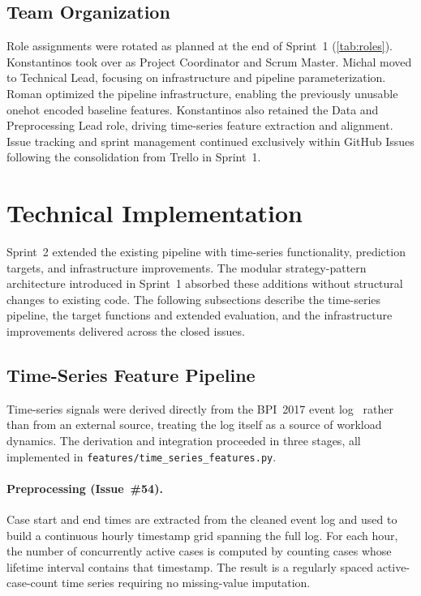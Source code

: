 \documentclass[runningheads]{llncs}
\begin{document}
\subsection{Team Organization}

Role assignments were rotated as planned at the end of Sprint~1 (\autoref{tab:roles}). Konstantinos took over as Project Coordinator and Scrum Master. Michal moved to Technical Lead, focusing on infrastructure and pipeline parameterization. Roman optimized the pipeline infrastructure, enabling the previously unusable onehot encoded baseline features. Konstantinos also retained the Data and Preprocessing Lead role, driving time-series feature extraction and alignment. Issue tracking and sprint management continued exclusively within GitHub Issues following the consolidation from Trello in Sprint~1.


\section{Technical Implementation}

Sprint~2 extended the existing pipeline with time-series functionality, prediction targets, and infrastructure improvements. The modular strategy-pattern architecture introduced in Sprint~1 absorbed these additions without structural changes to existing code. The following subsections describe the time-series pipeline, the target functions and extended evaluation, and the infrastructure improvements delivered across the closed issues.

\subsection{Time-Series Feature Pipeline}

Time-series signals were derived directly from the BPI~2017 event log~\cite{bpic2017} rather than from an external source, treating the log itself as a source of workload dynamics. The derivation and integration proceeded in three stages, all implemented in \texttt{features/time\_series\_features.py}.

\paragraph{Preprocessing (Issue~\#54).} Case start and end times are extracted from the cleaned event log and used to build a continuous hourly timestamp grid spanning the full log. For each hour, the number of concurrently active cases is computed by counting cases whose lifetime interval contains that timestamp. The result is a regularly spaced active-case-count time series requiring no missing-value imputation.
\end{document}
